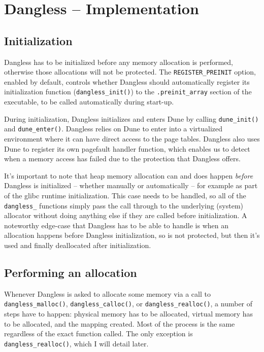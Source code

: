 \chapter{Dangless -- Implementation}
\label{ch:implementation}

\section{Initialization}
\label{sec:dangless-init}

Dangless has to be initialized before any memory allocation is performed, otherwise those allocations will not be protected. The \lstinline!REGISTER_PREINIT! option, enabled by default, controls whether Dangless should automatically register its initialization function (\lstinline!dangless_init()!) to the \lstinline!.preinit_array! section of the executable, to be called automatically during start-up.

During initialization, Dangless initializes and enters Dune by calling \lstinline!dune_init()! and \lstinline!dune_enter()!. Dangless relies on Dune to enter into a virtualized environment where it can have direct access to the page tables. Dangless also uses Dune to register its own pagefault handler function, which enables us to detect when a memory access has failed due to the protection that Dangless offers.

It's important to note that heap memory allocation can and does happen \emph{before} Dangless is initialized -- whether manually or automatically -- for example as part of the glibc runtime initialization. This case needs to be handled, so all of the \lstinline!dangless_! functions simply pass the call through to the underlying (system) allocator without doing anything else if they are called before initialization. A noteworthy edge-case that Dangless has to be able to handle is when an allocation happens before Dangless initialization, so is not protected, but then it's used and finally deallocated after initialization.

\section{Performing an allocation}

Whenever Dangless is asked to allocate some memory via a call to \lstinline!dangless_malloc()!, \lstinline!dangless_calloc()!, or \lstinline!dangless_realloc()!, a number of steps have to happen: physical memory has to be allocated, virtual memory has to be allocated, and the mapping created. Most of the process is the same regardless of the exact function called. The only exception is \lstinline!dangless_realloc()!, which I will detail later.

